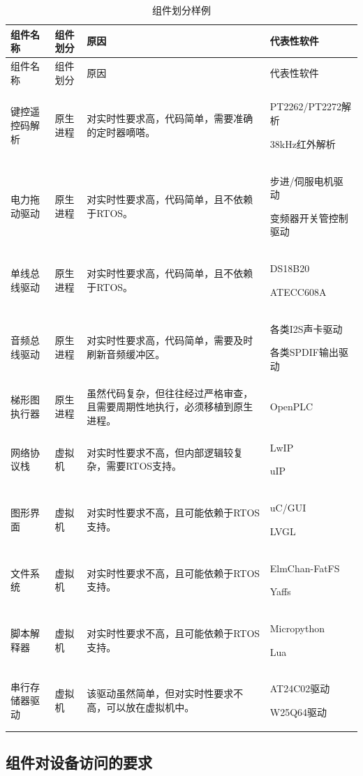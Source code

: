 \begin{xltabular}{\textwidth}{@{}>{\hsize\raggedright\arraybackslash}X>{\hsize\raggedright\arraybackslash}X>{\hsize\raggedright\arraybackslash}X>{\hsize\raggedright\arraybackslash}X@{}}
\caption{组件划分样例}\label{tab:6-1}\\
\toprule
组件名称 & 组件划分 & 原因 & 代表性软件\tabularnewline
\endfirsthead
\toprule
组件名称 & 组件划分 & 原因 & 代表性软件\tabularnewline
\midrule
\endhead
\bottomrule
\endlastfoot
键控遥控码解析\strut
 & 原生进程\strut
 & 对实时性要求高，代码简单，需要准确的定时器嘀嗒。\strut
 & PT2262/PT2272解析

38kHz红外解析\strut
\tabularnewline
电力拖动驱动\strut
 & 原生进程\strut
 & 对实时性要求高，代码简单，且不依赖于RTOS。\strut
 & 步进/伺服电机驱动

变频器开关管控制驱动\strut
\tabularnewline
单线总线驱动\strut
 & 原生进程\strut
 & 对实时性要求高，代码简单，且不依赖于RTOS。\strut
 & DS18B20

ATECC608A\strut
\tabularnewline
音频总线驱动\strut
 & 原生进程\strut
 & 对实时性要求高，代码简单，需要及时刷新音频缓冲区。\strut
 & 各类I2S声卡驱动

各类SPDIF输出驱动\strut
\tabularnewline
梯形图执行器 & 原生进程 &
虽然代码复杂，但往往经过严格审查，且需要周期性地执行，必须移植到原生进程。
& OpenPLC\tabularnewline
网络协议栈\strut
 & 虚拟机\strut
 & 对实时性要求不高，但内部逻辑较复杂，需要RTOS支持。\strut
 & LwIP

uIP\strut
\tabularnewline
图形界面\strut
 & 虚拟机\strut
 & 对实时性要求不高，且可能依赖于RTOS支持。\strut
 & uC/GUI

LVGL\strut
\tabularnewline
文件系统\strut
 & 虚拟机\strut
 & 对实时性要求不高，且可能依赖于RTOS支持。\strut
 & ElmChan-FatFS

Yaffs\strut
\tabularnewline
脚本解释器\strut
 & 虚拟机\strut
 & 对实时性要求不高，且可能依赖于RTOS支持。\strut
 & Micropython

Lua\strut
\tabularnewline
串行存储器驱动\strut
 & 虚拟机\strut
 & 该驱动虽然简单，但对实时性要求不高，可以放在虚拟机中。\strut
 & AT24C02驱动

W25Q64驱动\strut
\tabularnewline
\end{xltabular}

\subsection{组件对设备访问的要求}\label{subsec:6-2-3}

